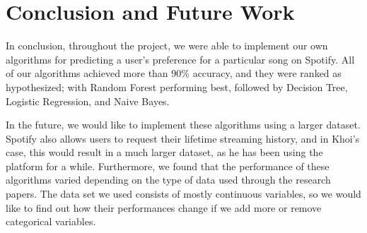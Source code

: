 \section{Conclusion and Future Work}

In conclusion, throughout the project, we were able to implement our own algorithms for predicting a user's preference for a particular song on Spotify. All of our algorithms achieved more than 90\% accuracy, and they were ranked as hypothesized; with Random Forest performing best, followed by Decision Tree, Logistic Regression, and Naive Bayes.

In the future, we would like to implement these algorithms using a larger dataset. Spotify also allows users to request their lifetime streaming history, and in Khoi's case, this would result in a much larger dataset, as he has been using the platform for a while. Furthermore, we found that the performance of these algorithms varied depending on the type of data used through the research papers. The data set we used consists of mostly continuous variables, so we would like to find out how their performances change if we add more or remove categorical variables. 